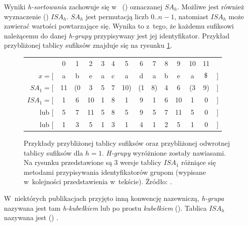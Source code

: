 \noindent
Wyniki \emph{h-sortowania} zachowuje się w~ () \cite{taxonomy} oznaczanej
$\textit{SA}_h$. Możliwe jest również wyznaczenie
() \cite{taxonomy} $\textit{ISA}_h$.
$\textit{SA}_h$ jest permutacją liczb $0..n-1$, natomiast
$\textit{ISA}_h$ może zawierać wartości powtarzające się. Wynika to z~tego,
że każdemu sufiksowi należącemu do danej \emph{h-grupy} przypisywany jest jej identyfikator.
Przykład przybliżonej tablicy sufiksów znajduje się na rysunku \ref{rys:approx-suffix-array}.

\begin{figure}[t]
    \begin{center}
        \begin{tabular}{ r c c c c c c c c c c c c l}
                                 & 0  & 1  & 2  & 3 & 4 & 5   & 6  & 7  & 8 & 9  & 10 & 11     \\ \cmidrule{2-13}
                         $x = [$ & a  & b  & e  & a & c & a   & d  & a  & b & e  & a  &
                       $\dollar$ &]\\ $\mathit{SA}_1 = [$ & 11 & (0 & 3  & 5 & 7 & 10) & (1 & 8) & 4 & 6  & (3 & 9)   & ] \\
            $\mathit{ISA}_1 = [$ & 1  & 6  & 10 & 1 & 8 & 1   & 9  & 1  & 6 & 10 & 1  & 0    & ]\\
                           lub [ & 5  & 7  & 11 & 5 & 8 & 5   & 9  & 5  & 7 & 11 & 5  & 0    & ]\\
                           lub [ & 1  & 3  & 5  & 1 & 3 & 1   & 4  & 1  & 2 & 5  & 1  & 0    & ]\\
        \end{tabular}
    \end{center}
\caption{Przykłady przybliżonej tablicy sufiksów oraz przybliżonej
odwrotnej tablicy sufiksów dla $h=1$. \emph{H-grupy}
wyróżnione zostały nawiasami. Na rysunku przedstawione są 3 wersje tablicy
$\textit{ISA}_1$ różniące się metodami przypisywania identyfikatorów grupom
(wypisane w~kolejności przedstawienia w~tekście).  Źródło: \cite{taxonomy}.}%
\label{rys:approx-suffix-array}
\end{figure}

W~niektórych publikacjach przyjęto inną konwencję nazewniczą, \emph{h-grupa} nazywana
jest tam \emph{h-kubełkiem} lub po prostu \emph{kubełkiem} ().
Tablica $\textit{ISA}_h$ nazywana jest 
() \cite{schurmann-phd}.

